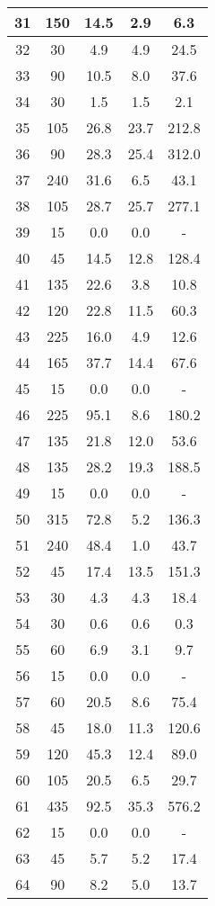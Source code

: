\documentclass[a4paper,10pt]{article}
\begin{document}
\begin{table}
\begin{tabular}{|c|c|c|c|c|}
\hline
31 & 150 & 14.5 & 2.9 & 6.3 \\
\hline
32 & 30 & 4.9 & 4.9 & 24.5 \\
\hline
33 & 90 & 10.5 & 8.0 & 37.6 \\
\hline
34 & 30 & 1.5 & 1.5 & 2.1 \\
\hline
35 & 105 & 26.8 & 23.7 & 212.8 \\
\hline
36 & 90 & 28.3 & 25.4 & 312.0 \\
\hline
37 & 240 & 31.6 & 6.5 & 43.1 \\
\hline
38 & 105 & 28.7 & 25.7 & 277.1 \\
\hline
39 & 15 & 0.0 & 0.0 & - \\
\hline
40 & 45 & 14.5 & 12.8 & 128.4 \\
\hline
41 & 135 & 22.6 & 3.8 & 10.8 \\
\hline
42 & 120 & 22.8 & 11.5 & 60.3 \\
\hline
43 & 225 & 16.0 & 4.9 & 12.6 \\
\hline
44 & 165 & 37.7 & 14.4 & 67.6 \\
\hline
45 & 15 & 0.0 & 0.0 & - \\
\hline
46 & 225 & 95.1 & 8.6 & 180.2 \\
\hline
47 & 135 & 21.8 & 12.0 & 53.6 \\
\hline
48 & 135 & 28.2 & 19.3 & 188.5 \\
\hline
49 & 15 & 0.0 & 0.0 & - \\
\hline
50 & 315 & 72.8 & 5.2 & 136.3 \\
\hline
51 & 240 & 48.4 & 1.0 & 43.7 \\
\hline
52 & 45 & 17.4 & 13.5 & 151.3 \\
\hline
53 & 30 & 4.3 & 4.3 & 18.4 \\
\hline
54 & 30 & 0.6 & 0.6 & 0.3 \\
\hline
55 & 60 & 6.9 & 3.1 & 9.7 \\
\hline
56 & 15 & 0.0 & 0.0 & - \\
\hline
57 & 60 & 20.5 & 8.6 & 75.4 \\
\hline
58 & 45 & 18.0 & 11.3 & 120.6 \\
\hline
59 & 120 & 45.3 & 12.4 & 89.0 \\
\hline
60 & 105 & 20.5 & 6.5 & 29.7 \\
\hline
61 & 435 & 92.5 & 35.3 & 576.2 \\
\hline
62 & 15 & 0.0 & 0.0 & - \\
\hline
63 & 45 & 5.7 & 5.2 & 17.4 \\
\hline
64 & 90 & 8.2 & 5.0 & 13.7 \\

\end{tabular}
\end{table}
\end{document}
